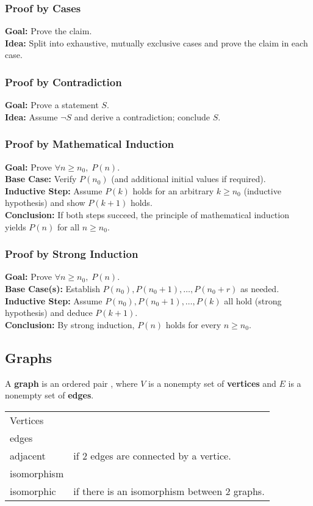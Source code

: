 \documentclass[5pt]{article}
\begin{document}
\begin{multicols}{2}
\subsubsection{Proof by Cases}
\textbf{Goal:} Prove the claim.\\
\textbf{Idea:} Split into exhaustive, mutually exclusive cases and prove the claim in each case.\\

\subsubsection{Proof by Contradiction}
\textbf{Goal:} Prove a statement $S$.\\
\textbf{Idea:} Assume $\lnot S$ and derive a contradiction; conclude $S$.\\

\subsubsection{Proof by Mathematical Induction}
\textbf{Goal:} Prove $\forall n\ge n_0,\;P(n)$.\\
\textbf{Base Case:} Verify $P(n_0)$ (and additional initial values if required).\\
\textbf{Inductive Step:} Assume $P(k)$ holds for an arbitrary $k\ge n_0$ (inductive hypothesis) and show $P(k+1)$ holds.\\
\textbf{Conclusion:} If both steps succeed, the principle of mathematical induction yields $P(n)$ for all $n\ge n_0$.\\

\subsubsection{Proof by Strong Induction}
\textbf{Goal:} Prove $\forall n\ge n_0,\;P(n)$.\\
\textbf{Base Case(s):} Establish $P(n_0),P(n_0+1),\dots,P(n_0+r)$ as needed.\\
\textbf{Inductive Step:} Assume $P(n_0),P(n_0+1),\dots,P(k)$ all hold (strong hypothesis) and deduce $P(k+1)$.\\
\textbf{Conclusion:} By strong induction, $P(n)$ holds for every $n\ge n_0$.\\

\subsection{Graphs}
A \textbf{graph} is an ordered pair , where $V$ is a nonempty set of \textbf{vertices} and $E$ is a nonempty set of \textbf{edges}.\\
\begin{tabular}{ll}
    Vertices & \\
    edges    & \\
    adjacent & if 2 edges are connected by a vertice.\\
    isomorphism & \\
    isomorphic  & if there is an isomorphism between 2 graphs.\\
    
\end{tabular}

\end{multicols}
\end{document}
